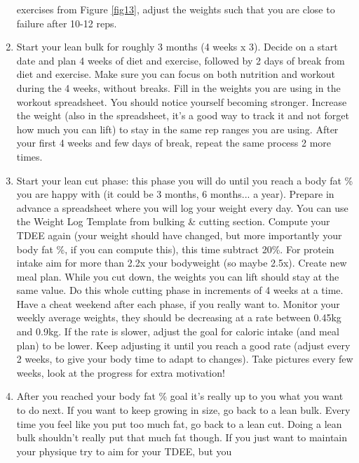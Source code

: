 \documentclass[openany, 12pt]{book}
\begin{document}
\begin{enumerate}
                  exercises from Figure \ref{fig13}, adjust the weights such that you are close to failure after 10-12 reps.
                \item Start your lean bulk for roughly 3 months (4 weeks x 3). Decide on a start date and plan 4 weeks of diet and exercise, followed by 2 days of break from diet and exercise.
                  Make sure you can focus on both nutrition and workout during the 4 weeks, without breaks. 
                  Fill in the weights you are using in the workout spreadsheet. You should notice yourself becoming stronger. Increase the weight (also in the spreadsheet, it's
                  a good way to track it and not forget how much you can lift) to stay in the same rep ranges you are using. After your first 4 weeks and few days of break,
                  repeat the same process 2 more times.
                \item Start your lean cut phase: this phase you will do until you reach a body fat \% you are happy with (it could be 3 months, 6 months... a year). Prepare in advance a spreadsheet
                  where you will log your weight every day. You can use the Weight Log Template from bulking \& cutting section.
                  Compute your TDEE again (your weight should have changed, but more importantly your body fat \%, if you can
                  compute this), this time subtract 20\%. For protein intake aim
                  for more than 2.2x your bodyweight (so maybe 2.5x). Create new meal plan. While you cut down, the weights you can lift should stay at the same value. Do this whole cutting phase in
                  increments of 4 weeks at a time. Have a cheat weekend after each phase, if you really want to. Monitor your weekly average weights, they should be decreasing at a rate between
                  0.45kg and 0.9kg. If the rate is slower, adjust the goal for caloric intake (and meal plan) to be lower.
                  Keep adjusting it until you reach a good rate (adjust every 2 weeks, to give your body time to adapt to changes).
                  Take pictures every few weeks, look at the progress for extra motivation!
                \item After you reached your body fat \% goal it's really up to you what you want to do next. If you want to keep growing in size, go back to a lean bulk. Every time you feel like
                  you put too much fat, go back to a lean cut. Doing a lean bulk shouldn't really put that much fat though. If you just want to maintain your physique try to aim for your TDEE, but you

\end{enumerate}
\end{document}
